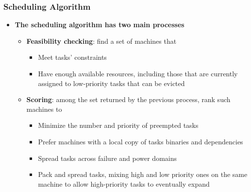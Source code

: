 \begin{frame}
\frametitle{Scheduling Algorithm}
\begin{itemize}
	\item {\bf The scheduling algorithm has two main processes}

\vspace{20pt}

	\begin{itemize}
		\item {\bf Feasibility checking}: find a set of machines that
		\begin{itemize}
		 	\item Meet tasks' constraints
		 	\item Have enough available resources, including those that are currently assigned to low-priority tasks that can be evicted
		 \end{itemize}

\vspace{20pt}

		\item {\bf Scoring}: among the set returned by the previous process, rank such machines to
		\begin{itemize}
			\item Minimize the number and priority of preempted tasks
			\item Prefer machines with a local copy of tasks binaries and dependencies
			\item Spread tasks across failure and power domains
			\item Pack and spread tasks, mixing high and low priority ones on the same machine to allow high-priority tasks to eventually expand
		\end{itemize}
	\end{itemize}
\end{itemize}
\end{frame}

